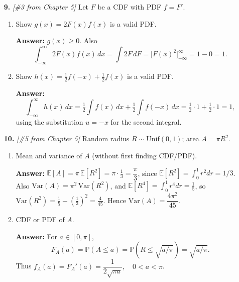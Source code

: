 \documentclass[11pt]{article}
\begin{document}
\begin{enumerate}
\item[\textbf{9.}] \emph{[\#3 from Chapter 5]}
Let $F$ be a CDF with PDF $f=F'$.

\begin{enumerate}[label=(\alph*)]
\item Show $g(x)=2F(x)f(x)$ is a valid PDF.

\textbf{Answer:} $g(x)\ge 0$. Also
\[
\int_{-\infty}^{\infty} 2F(x)f(x)\,dx
= \int 2F\,dF = \big[F(x)^2\big]_{-\infty}^{\infty}=1-0=1.
\]

\item Show $h(x)=\tfrac12 f(-x)+\tfrac12 f(x)$ is a valid PDF.

\textbf{Answer:}
\[
\int_{-\infty}^{\infty}\!\! h(x)\,dx
= \tfrac12 \int f(x)\,dx + \tfrac12 \int f(-x)\,dx
= \tfrac12 \cdot 1 + \tfrac12 \cdot 1 = 1,
\]
using the substitution $u=-x$ for the second integral.
\end{enumerate}

\item[\textbf{10.}] \emph{[\#5 from Chapter 5]} Random radius $R\sim \mathrm{Unif}(0,1)$; area $A=\pi R^2$.

\begin{enumerate}[label=(\alph*)]
\item Mean and variance of $A$ (without first finding CDF/PDF).

\textbf{Answer:} $\mathbb{E}[A]=\pi\,\mathbb{E}[R^2]=\pi\cdot \frac{1}{3}=\dfrac{\pi}{3}$, since $\mathbb{E}[R^2]=\int_0^1 r^2 dr=1/3$.
Also $\mathrm{Var}(A)=\pi^2\,\mathrm{Var}(R^2)$, and
$\mathbb{E}[R^4]=\int_0^1 r^4 dr=\tfrac{1}{5}$, so
$\mathrm{Var}(R^2)=\tfrac{1}{5}-\left(\tfrac{1}{3}\right)^2=\tfrac{4}{45}$.
Hence $\mathrm{Var}(A)=\dfrac{4\pi^2}{45}$.

\item CDF or PDF of $A$.

\textbf{Answer:} For $a\in[0,\pi]$,
\[
F_A(a)=\mathbb{P}(A\le a)=\mathbb{P}\!\left(R\le \sqrt{a/\pi}\right)=\sqrt{a/\pi}.
\]
Thus $f_A(a)=F_A'(a)=\dfrac{1}{2\sqrt{\pi a}},\quad 0<a<\pi$.
\end{enumerate}

\end{enumerate}
\end{document}
